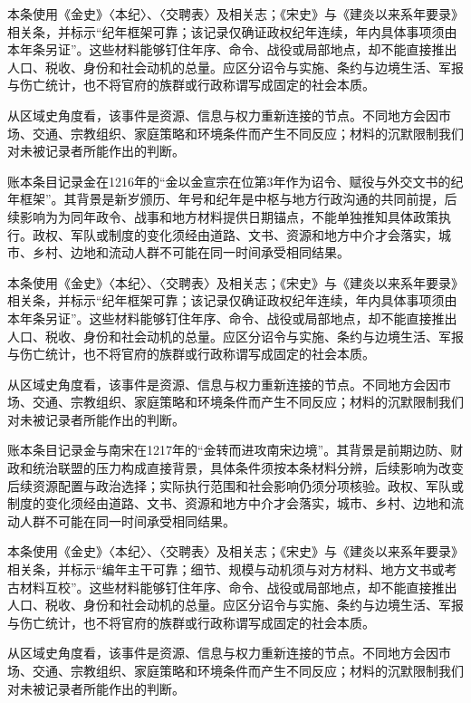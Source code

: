 本条使用《金史》〈本纪〉、〈交聘表〉及相关志；《宋史》与《建炎以来系年要录》相关条，并标示“纪年框架可靠；该记录仅确证政权纪年连续，年内具体事项须由本年条另证”。这些材料能够钉住年序、命令、战役或局部地点，却不能直接推出人口、税收、身份和社会动机的总量。应区分诏令与实施、条约与边境生活、军报与伤亡统计，也不将官府的族群或行政称谓写成固定的社会本质。

从区域史角度看，该事件是资源、信息与权力重新连接的节点。不同地方会因市场、交通、宗教组织、家庭策略和环境条件而产生不同反应；材料的沉默限制我们对未被记录者所能作出的判断。

账本条目记录金在1216年的“金以金宣宗在位第3年作为诏令、赋役与外交文书的纪年框架”。其背景是新岁颁历、年号和纪年是中枢与地方行政沟通的共同前提，后续影响为为同年政令、战事和地方材料提供日期锚点，不能单独推知具体政策执行。政权、军队或制度的变化须经由道路、文书、资源和地方中介才会落实，城市、乡村、边地和流动人群不可能在同一时间承受相同结果。

本条使用《金史》〈本纪〉、〈交聘表〉及相关志；《宋史》与《建炎以来系年要录》相关条，并标示“纪年框架可靠；该记录仅确证政权纪年连续，年内具体事项须由本年条另证”。这些材料能够钉住年序、命令、战役或局部地点，却不能直接推出人口、税收、身份和社会动机的总量。应区分诏令与实施、条约与边境生活、军报与伤亡统计，也不将官府的族群或行政称谓写成固定的社会本质。

从区域史角度看，该事件是资源、信息与权力重新连接的节点。不同地方会因市场、交通、宗教组织、家庭策略和环境条件而产生不同反应；材料的沉默限制我们对未被记录者所能作出的判断。

账本条目记录金与南宋在1217年的“金转而进攻南宋边境”。其背景是前期边防、财政和统治联盟的压力构成直接背景，具体条件须按本条材料分辨，后续影响为改变后续资源配置与政治选择；实际执行范围和社会影响仍须分项核验。政权、军队或制度的变化须经由道路、文书、资源和地方中介才会落实，城市、乡村、边地和流动人群不可能在同一时间承受相同结果。

本条使用《金史》〈本纪〉、〈交聘表〉及相关志；《宋史》与《建炎以来系年要录》相关条，并标示“编年主干可靠；细节、规模与动机须与对方材料、地方文书或考古材料互校”。这些材料能够钉住年序、命令、战役或局部地点，却不能直接推出人口、税收、身份和社会动机的总量。应区分诏令与实施、条约与边境生活、军报与伤亡统计，也不将官府的族群或行政称谓写成固定的社会本质。

从区域史角度看，该事件是资源、信息与权力重新连接的节点。不同地方会因市场、交通、宗教组织、家庭策略和环境条件而产生不同反应；材料的沉默限制我们对未被记录者所能作出的判断。

